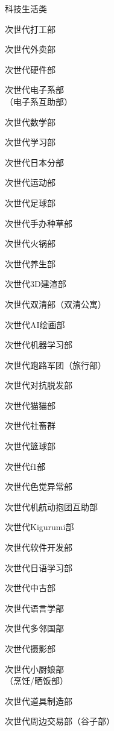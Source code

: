 \begin{multicols}{3}
    \begin{categorysection}{科技生活类}
        \item 次世代打工部
        \item 次世代外卖部
        \item 次世代硬件部
        \item 次世代电子系部\\（电子系互助部）
        \item 次世代数学部
        \item 次世代学习部
        \item 次世代日本分部
        \item 次世代运动部
        \item 次世代足球部
        \item 次世代手办种草部
        \item 次世代火锅部
        \item 次世代养生部
        \item 次世代3D建渲部
        \item 次世代双清部（双清公寓）
        \item 次世代AI绘画部
        \item 次世代机器学习部
        \item 次世代跑路军团（旅行部）
        \item 次世代对抗脱发部
        \item 次世代猫猫部
        \item 次世代社畜群
        \item 次世代篮球部
        \item 次世代f1部
        \item 次世代色觉异常部
        \item 次世代机航动抱团互助部
        \item 次世代Kigurumi部
        \item 次世代软件开发部
        \item 次世代日语学习部
        \item 次世代中古部
        \item 次世代语言学部
        \item 次世代多邻国部
        \item 次世代摄影部
        \item 次世代小厨娘部\\（烹饪/晒饭部）
        \item 次世代道具制造部
        \item 次世代周边交易部（谷子部）
    \end{categorysection}

\end{multicols}
